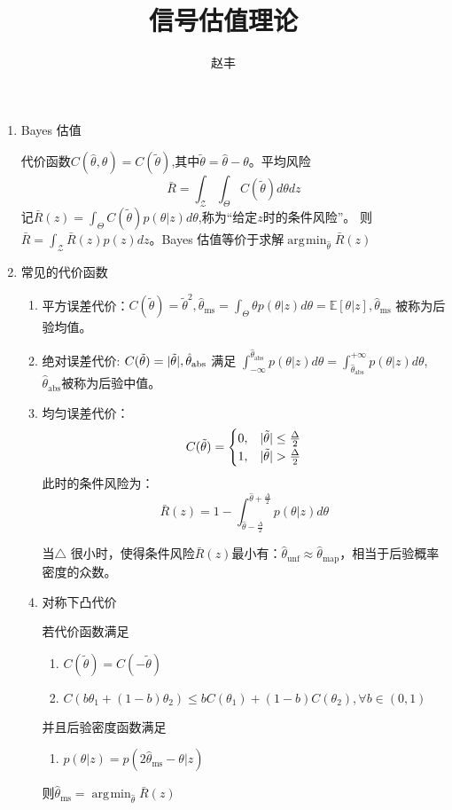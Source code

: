 \documentclass{article}
\def\E{\mathbb{E}}
\DeclareMathOperator*\argmin{\arg\!\min}
\DeclarePairedDelimiter\abs{\lvert}{\rvert}
\begin{document}
\title{信号估值理论}
\author{赵丰}
\maketitle
\begin{enumerate}
\item Bayes 估值

代价函数$C(\hat{\theta},\theta)=C(\tilde{\theta})$,其中$\tilde{\theta}=\hat{\theta}-\theta$。平均风险
$$
\bar{R}=\int_{\mathcal{Z}}\int_{\Theta} C(\tilde{\theta}) d\theta dz
$$
记$\bar{R}(z)=\int_{\Theta} C(\tilde{\theta})p(\theta|z)d\theta$,称为“给定$z$时的条件风险”。
则 $\bar{R}=\int_{\mathcal{Z}}\bar{R}(z)p(z)dz$。Bayes 估值等价于求解$\displaystyle\argmin_{\hat{\theta}} \bar{R}(z)$

\item 常见的代价函数
\begin{enumerate}[label=(\arabic*)]
\item 平方误差代价：$C(\tilde{\theta})=\tilde{\theta}^2, \hat{\theta}_{\mathrm{ms}} =\int_{\Theta}\theta p(\theta|z)d\theta = \E[\theta|z], \hat{\theta}_{\mathrm{ms}}$ 被称为后验均值。

\item 绝对误差代价: $C(\tilde{\theta})=\abs{\tilde{\theta}},\hat{\theta}_{\mathrm{abs}}$ 满足 $\int_{-\infty}^{\hat{\theta}_{\mathrm{abs}}} p(\theta|z)d\theta=\int_{\hat{\theta}_{\mathrm{abs}}}^{+\infty} p(\theta|z)d\theta$, $\hat{\theta}_{\mathrm{abs}}$被称为后验中值。

\item 均匀误差代价：
$$C(\tilde{\theta})=\begin{cases} 0, & \abs{\tilde{\theta}}\leq \frac{\Delta}{2}\\ 1, & \abs{\tilde{\theta}}>\frac{\Delta}{2}\end{cases}$$
此时的条件风险为：
$$ \bar{R}(z) = 1-\int_{\hat{\theta}-\frac{\Delta}{2}}^{\hat{\theta}+\frac{\Delta}{2}} p(\theta|z)d\theta $$

当$\triangle$ 很小时，使得条件风险$\bar{R}(z)$最小有：$\hat{\theta}_{\mathrm{unf}}\approx \hat{\theta}_{\mathrm{map}}$，相当于后验概率密度的众数。 
\item 对称下凸代价

若代价函数满足
\begin{enumerate}[label=(\alph*)]
\item $C(\tilde{\theta})=C(-\tilde{\theta})$
\item $C(b\theta_1+(1-b)\theta_2) \leq bC(\theta_1) + (1-b)C(\theta_2), \forall b\in(0,1)$
\end{enumerate}
并且后验密度函数满足
\begin{enumerate}[resume,label=(\alph*)]
\item $p(\theta|z)=p(2\hat{\theta}_{\textrm{ms}}-\theta|z)$
\end{enumerate}
则$\hat{\theta}_{\textrm{ms}}=\displaystyle\argmin_{\hat{\theta}} \bar{R}(z)$


\end{enumerate}
\end{enumerate}
\end{document}
